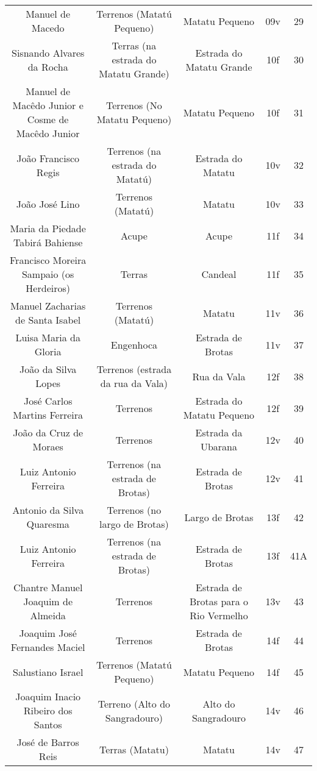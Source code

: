 \begin{table}[!htp]
{\begin{tiny}
\begin{tabular}{ccccc}
Manuel de Macedo								&Terrenos (Matatú Pequeno)		&Matatu Pequeno				&09v			&29			&\\
Sisnando Alvares da Rocha							&Terras (na estrada do Matatu Grande)	&Estrada do Matatu Grande		&10f			&30			&\\
Manuel de Macêdo Junior e Cosme de Macêdo Junior				&Terrenos (No Matatu Pequeno)		&Matatu Pequeno				&10f			&31			&\\
João Francisco Regis								&Terrenos (na estrada do Matatú)	&Estrada do Matatu			&10v			&32			&\\
João José Lino									&Terrenos (Matatú)			&Matatu					&10v			&33			&\\
Maria da Piedade Tabirá Bahiense						&Acupe					&Acupe					&11f			&34			&\\
Francisco Moreira Sampaio (os Herdeiros)					&Terras					&Candeal				&11f			&35			&\\
Manuel Zacharias de Santa Isabel						&Terrenos (Matatú)			&Matatu					&11v			&36			&\\
Luisa Maria da Gloria								&Engenhoca				&Estrada de Brotas			&11v			&37			&\\
João da Silva Lopes								&Terrenos (estrada da rua da Vala)	&Rua da Vala				&12f			&38			&\\
José Carlos Martins Ferreira							&Terrenos				&Estrada do Matatu Pequeno		&12f			&39			&\\
João da Cruz de Moraes								&Terrenos				&Estrada da Ubarana			&12v			&40			&\\
Luiz Antonio Ferreira								&Terrenos (na estrada de Brotas)	&Estrada de Brotas			&12v			&41			&\\
Antonio da Silva Quaresma							&Terrenos (no largo de Brotas)		&Largo de Brotas			&13f			&42			&\\
Luiz Antonio Ferreira								&Terrenos (na estrada de Brotas)	&Estrada de Brotas			&13f			&41A			&\\
Chantre Manuel Joaquim de Almeida						&Terrenos				&Estrada de Brotas para o Rio Vermelho	&13v			&43			&\\
Joaquim José Fernandes Maciel							&Terrenos				&Estrada de Brotas			&14f			&44			&\\
Salustiano Israel								&Terrenos (Matatú Pequeno)		&Matatu Pequeno				&14f			&45			&\\
Joaquim Inacio Ribeiro dos Santos						&Terreno (Alto do Sangradouro)		&Alto do Sangradouro			&14v			&46			&\\
José de Barros Reis								&Terras (Matatu)			&Matatu					&14v			&47			&\\

\end{tabular}
\end{tiny}}
\end{table}
